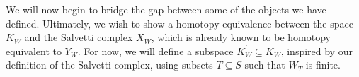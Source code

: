 \documentclass[class=article, crop=false]{standalone}
\begin{document}
We will now begin to bridge the gap between some of the objects we have defined. Ultimately, we wish to show a homotopy equivalence between the space $K_{W}$ and the Salvetti complex $X_W$, which is already known to be homotopy equivalent to $Y_W$. For now, we will define a subspace $K_{W}^\prime \subseteq K_{W}$, inspired by our definition of the Salvetti complex, using subsets $T\subseteq S$ such that $W_T$ is finite.
\end{document}
